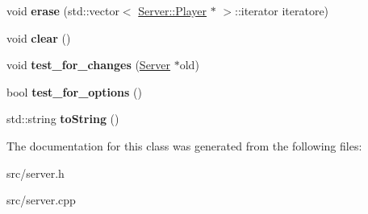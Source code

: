 \begin{DoxyCompactItemize}
\item 
\hypertarget{class_server_abc38dc465119c5c0b409f72f1a117b06}{
void {\bfseries erase} (std::vector$<$ \hyperlink{class_server_1_1_player}{Server::Player} $\ast$ $>$::iterator iteratore)}
\label{class_server_abc38dc465119c5c0b409f72f1a117b06}

\item 
\hypertarget{class_server_ab15792aee517add66b1d3058e8875b83}{
void {\bfseries clear} ()}
\label{class_server_ab15792aee517add66b1d3058e8875b83}

\item 
\hypertarget{class_server_ab62f3d05e0ecb55a675f522f9cba8ec8}{
void {\bfseries test\_\-for\_\-changes} (\hyperlink{class_server}{Server} $\ast$old)}
\label{class_server_ab62f3d05e0ecb55a675f522f9cba8ec8}

\item 
\hypertarget{class_server_a4f41294099b2bcff352db6b43a73fa31}{
bool {\bfseries test\_\-for\_\-options} ()}
\label{class_server_a4f41294099b2bcff352db6b43a73fa31}

\item 
\hypertarget{class_server_a951cdd4458a8bb24057ed4beedd425e0}{
std::string {\bfseries toString} ()}
\label{class_server_a951cdd4458a8bb24057ed4beedd425e0}

\end{DoxyCompactItemize}


The documentation for this class was generated from the following files:\begin{DoxyCompactItemize}
\item 
src/server.h\item 
src/server.cpp\end{DoxyCompactItemize}
